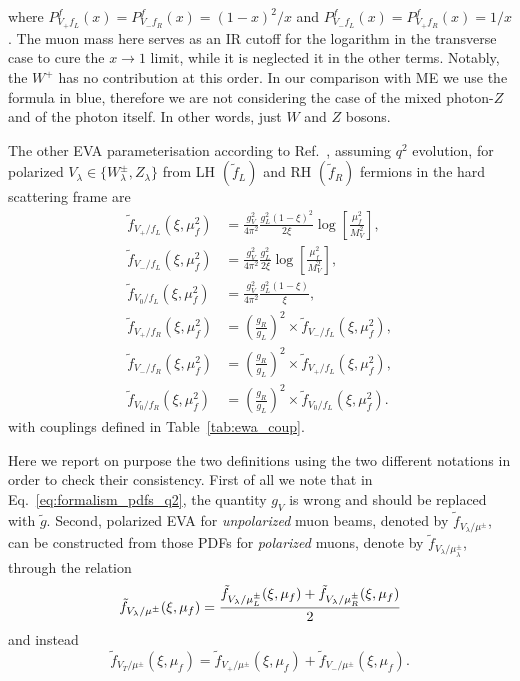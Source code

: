 \documentclass[a4paper,11pt]{article}
\begin{document}
where $P_{V_+ f_L}^f(x) = P_{V_- f_R}^f(x) = (1-x)^2 / x$ and $P_{V_- f_L}^f(x) = P_{V_+ f_R}^f(x) = 1 / x$.
The muon mass here serves as an IR cutoff for the logarithm in the transverse case to cure the $x\to 1$ limit, while it is neglected it in the other terms. Notably, the $W^+$ has no contribution at this order.
In our comparison with ME we use the formula in {\color{blue} blue}, therefore we are not considering the case of the mixed photon-$Z$ and of the photon itself.
In other words, just $W$ and $Z$ bosons.

The other EVA parameterisation  according to Ref.~\cite{Ruiz:2021tdt}, assuming $q^2$ evolution,
 for polarized $V_\lambda\in\{W_\lambda^\pm,Z_\lambda\}$ from LH $(\tilde{f}_L)$ and RH $(\tilde{f}_R)$ fermions in the hard scattering frame are 
\begin{subequations}
\label{eq:formalism_pdfs_q2}
\begin{align}
\tilde{f}_{V_+/f_L}(\xi,\mu_f^2) 	&= \frac{g_V^2}{4\pi^2} \frac{g_L^2(1-\xi)^2}{2\xi} \log \left[\frac{\mu_f^2}{M_V^2}\right], \\
\tilde{f}_{V_-/f_L}(\xi,\mu_f^2) 	&= \frac{g_V^2}{4\pi^2} \frac{g_L^2}{2\xi} \log \left[\frac{\mu_f^2}{M_V^2}\right], \\
\tilde{f}_{V_0 / f_L}(\xi,\mu_f^2) 	&= \frac{g_V^2}{4\pi^2} \frac{g_L^2(1-\xi)}{\xi},\\  
\tilde{f}_{V_+/f_R}(\xi,\mu_f^2) 	&= \left(\frac{g_R}{g_L}\right)^2 \times \tilde{f}_{V_-/f_L}(\xi,\mu_f^2), \\
\tilde{f}_{V_-/f_R}(\xi,\mu_f^2) 	&= \left(\frac{g_R}{g_L}\right)^2 \times \tilde{f}_{V_+/f_L}(\xi,\mu_f^2), \\
\tilde{f}_{V_0/f_R}(\xi,\mu_f^2) 	&= \left(\frac{g_R}{g_L}\right)^2 \times \tilde{f}_{V_0/f_L}(\xi,\mu_f^2). 
\end{align}
\end{subequations}
%
with couplings defined in Table~\ref{tab:ewa_coup}.

Here we report on purpose the two definitions using the two different notations in order to check their consistency.
First of all we note that in Eq.~\eqref{eq:formalism_pdfs_q2}, the quantity $g_V$ is wrong and should be replaced with $\tilde{g}$. Second,
polarized EVA for \textit{unpolarized} muon beams, denoted by $\tilde{f}_{V_\lambda/\mu^\pm}$, can be constructed from those PDFs for \textit{polarized} muons, denote by $\tilde{f}_{V_\lambda/\mu^\pm_\lambda}$, through the relation
\begin{equation}
 \tilde{f}_{V_\lambda/\mu^\pm}(\xi,\mu_f) =
 \cfrac{\tilde{f}_{V_\lambda/\mu^\pm_L}(\xi,\mu_f) + \tilde{f}_{V_\lambda/\mu^\pm_R}(\xi,\mu_f)}{2}
\label{eq:pdfDef_unpolarizedMuon}
\end{equation}
%
and instead 
%
\begin{equation}
 \tilde{f}_{V_T/\mu^\pm}(\xi,\mu_f) =
\tilde{f}_{V_+/\mu^\pm}(\xi,\mu_f) + \tilde{f}_{V_-/\mu^\pm}(\xi,\mu_f).
\label{eq:pdfDef_unpolarizedMuon}
\end{equation}
\end{document}
